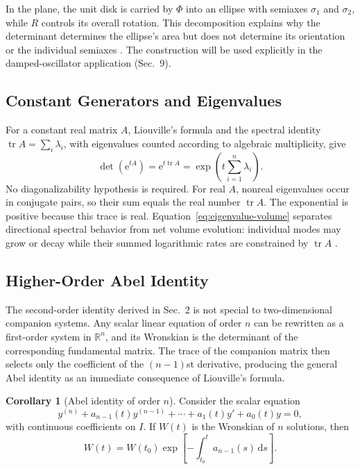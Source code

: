 \documentclass[11pt,a4paper]{article}
\newcommand{\be}{\begin{equation}}
\newcommand{\ee}{\end{equation}}
\newcommand{\lb}[1]{\label{#1}}
\newcommand{\e}{\mathrm{e}}
\newcommand{\dd}{\mathrm{d}}
\newcommand{\R}{\mathbb{R}}
\DeclareMathOperator{\tr}{tr}
\theoremstyle{definition}
\newtheorem{corollary}{Corollary}[section]
\numberwithin{equation}{section}
\begin{document}
In the plane, the unit disk is carried by $\Phi$ into an ellipse with semiaxes $\sigma_1$ and $\sigma_2$, while $R$ controls its overall rotation. This decomposition explains why the determinant determines the ellipse's area but does not determine its orientation or the individual semiaxes \cite{horn2013}. The construction will be used explicitly in the damped-oscillator application (Sec.~9).

\subsection{Constant Generators and Eigenvalues}

For a constant real matrix $A$, Liouville's formula and the spectral identity $\tr A=\sum_i\lambda_i$, with eigenvalues counted according to algebraic multiplicity, give
\be
\det(\e^{tA})
=
\e^{t\tr A}
=
\exp\left(t\sum_{i=1}^{n}\lambda_i\right).
\lb{eq:eigenvalue-volume}
\ee
No diagonalizability hypothesis is required. For real $A$, nonreal eigenvalues occur in conjugate pairs, so their sum equals the real number $\tr A$. The exponential is positive because this trace is real. Equation~\eqref{eq:eigenvalue-volume} separates directional spectral behavior from net volume evolution: individual modes may grow or decay while their summed logarithmic rates are constrained by $\tr A$ \cite{horn2013}.

\subsection{Higher-Order Abel Identity}

The second-order identity derived in Sec.~2 is not special to two-dimensional companion systems. Any scalar linear equation of order $n$ can be rewritten as a first-order system in $\R^n$, and its Wronskian is the determinant of the corresponding fundamental matrix. The trace of the companion matrix then selects only the coefficient of the $(n-1)$st derivative, producing the general Abel identity as an immediate consequence of Liouville's formula.

\begin{corollary}[Abel identity of order $n$]
Consider the scalar equation
\be
 y^{(n)}+a_{n-1}(t)y^{(n-1)}+\cdots+a_1(t)y'+a_0(t)y=0,
\lb{eq:nth-order-ode}
\ee
with continuous coefficients on $I$. If $W(t)$ is the Wronskian of $n$ solutions, then
\be
W(t)=W(t_0)
\exp\left[-\int_{t_0}^{t}a_{n-1}(s)\,\dd s\right].
\lb{eq:nth-order-abel}
\ee
\end{corollary}
\end{document}
